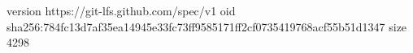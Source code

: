 version https://git-lfs.github.com/spec/v1
oid sha256:784fc13d7af35ea14945e33fc73ff9585171ff2cf0735419768acf55b51d1347
size 4298
